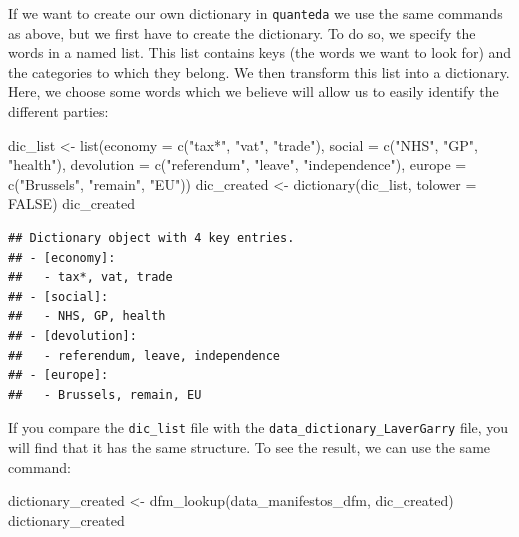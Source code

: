 \documentclass[
]{book}
\newenvironment{Shaded}{\begin{snugshade}}{\end{snugshade}}
\newcommand{\AttributeTok}[1]{\textcolor[rgb]{0.77,0.63,0.00}{#1}}
\newcommand{\ConstantTok}[1]{\textcolor[rgb]{0.00,0.00,0.00}{#1}}
\newcommand{\FunctionTok}[1]{\textcolor[rgb]{0.00,0.00,0.00}{#1}}
\newcommand{\NormalTok}[1]{#1}
\newcommand{\OtherTok}[1]{\textcolor[rgb]{0.56,0.35,0.01}{#1}}
\newcommand{\StringTok}[1]{\textcolor[rgb]{0.31,0.60,0.02}{#1}}
\begin{document}
If we want to create our own dictionary in \texttt{quanteda} we use the same commands as above, but we first have to create the dictionary. To do so, we specify the words in a named list. This list contains keys (the words we want to look for) and the categories to which they belong. We then transform this list into a dictionary. Here, we choose some words which we believe will allow us to easily identify the different parties:

\begin{Shaded}
\begin{Highlighting}[]
\NormalTok{dic\_list }\OtherTok{\textless{}{-}} \FunctionTok{list}\NormalTok{(}\AttributeTok{economy =} \FunctionTok{c}\NormalTok{(}\StringTok{"tax*"}\NormalTok{, }\StringTok{"vat"}\NormalTok{, }\StringTok{"trade"}\NormalTok{), }\AttributeTok{social =} \FunctionTok{c}\NormalTok{(}\StringTok{"NHS"}\NormalTok{, }
    \StringTok{"GP"}\NormalTok{, }\StringTok{"health"}\NormalTok{), }\AttributeTok{devolution =} \FunctionTok{c}\NormalTok{(}\StringTok{"referendum"}\NormalTok{, }\StringTok{"leave"}\NormalTok{, }\StringTok{"independence"}\NormalTok{), }
    \AttributeTok{europe =} \FunctionTok{c}\NormalTok{(}\StringTok{"Brussels"}\NormalTok{, }\StringTok{"remain"}\NormalTok{, }\StringTok{"EU"}\NormalTok{))}
\NormalTok{dic\_created }\OtherTok{\textless{}{-}} \FunctionTok{dictionary}\NormalTok{(dic\_list, }\AttributeTok{tolower =} \ConstantTok{FALSE}\NormalTok{)}
\NormalTok{dic\_created}
\end{Highlighting}
\end{Shaded}

\begin{verbatim}
## Dictionary object with 4 key entries.
## - [economy]:
##   - tax*, vat, trade
## - [social]:
##   - NHS, GP, health
## - [devolution]:
##   - referendum, leave, independence
## - [europe]:
##   - Brussels, remain, EU
\end{verbatim}

If you compare the \texttt{dic\_list} file with the \texttt{data\_dictionary\_LaverGarry} file, you will find that it has the same structure. To see the result, we can use the same command:

\begin{Shaded}
\begin{Highlighting}[]
\NormalTok{dictionary\_created }\OtherTok{\textless{}{-}} \FunctionTok{dfm\_lookup}\NormalTok{(data\_manifestos\_dfm, dic\_created)}
\NormalTok{dictionary\_created}
\end{Highlighting}
\end{Shaded}
\end{document}
